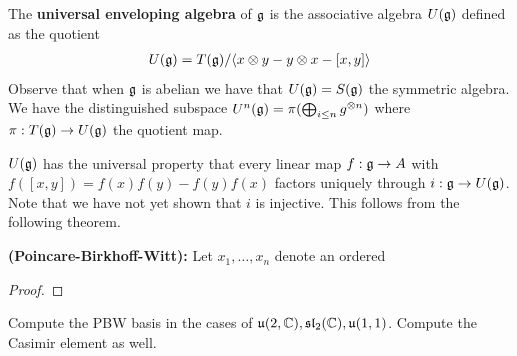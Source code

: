 \documentclass[12pt]{article}
\begin{document}
\begin{definition}
The \textbf{universal enveloping algebra} of $\mathfrak{g}$ is the associative algebra $U(\mathfrak{g})$ defined as the quotient \begin{align*}
    U(\mathfrak{g}) = T(\mathfrak{g}) / \langle x\otimes y - y\otimes x - [x,y]\rangle
\end{align*} Observe that when $\mathfrak{g}$ is abelian we have that $U(\mathfrak{g})  = S(\mathfrak{g})$ the symmetric algebra. We have the distinguished subspace $U^n(\mathfrak{g}) = \pi(\bigoplus_{i\leq n}g^{\otimes n})$ where $\pi:T(\mathfrak{g})\to U(\mathfrak{g})$ the quotient map. 

\hfill 

$U(\mathfrak{g})$ has the universal property that every linear map $f:\mathfrak{g}\to A$ with $f([x,y]) = f(x)f(y) - f(y)f(x)$ factors uniquely through $i:\mathfrak{g}\to U(\mathfrak{g})$. Note that we have not yet shown that $i$ is injective. This follows from the following theorem.

\begin{theorem}
\textbf{(Poincare-Birkhoff-Witt):}
Let $x_1,\dots,x_n$ denote an ordered
\end{theorem}
\begin{proof}
\end{proof}
\begin{example}
    Compute the PBW basis in the cases of $\mathfrak{u}(2,\mathbb{C}),\mathfrak{sl}_2(\mathbb{C}),\mathfrak{u}(1,1)$. Compute the Casimir element as well.
\end{example}
\end{definition}
\end{document}
